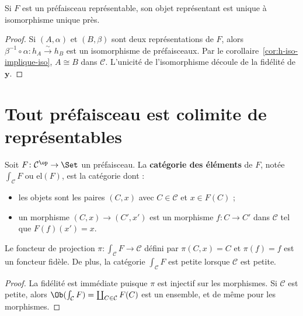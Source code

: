 \begin{proposition}\label{prop:representant-unique}
Si $F$ est un préfaisceau représentable, son objet représentant
est unique à isomorphisme unique près.
\end{proposition}

\begin{proof}
Si $(A, \alpha)$ et $(B, \beta)$ sont deux représentations de $F$,
alors $\beta^{-1} \circ \alpha \colon h_A \xrightarrow{\sim} h_B$
est un isomorphisme de préfaisceaux. Par le
corollaire~\ref{cor:h-iso-implique-iso}, $A \cong B$ dans $\mathcal{C}$.
L'unicité de l'isomorphisme découle de la fidélité de $\mathbf{y}$.
\end{proof}


\section{Tout préfaisceau est colimite de représentables}%
\label{sec:prefaisceau-colimite}

\begin{definition}\label{def:categorie-elements}
Soit $F \colon \mathcal{C}^{\op} \to \Set$ un préfaisceau.
La \textbf{catégorie des éléments} de $F$, notée
$\int_{\mathcal{C}} F$ ou $\mathrm{el}(F)$, est la catégorie dont :
\begin{itemize}
    \item les objets sont les paires $(C, x)$ avec $C \in \mathcal{C}$
    et $x \in F(C)$ ;
    \item un morphisme $(C, x) \to (C', x')$ est un morphisme
    $f \colon C \to C'$ dans $\mathcal{C}$ tel que $F(f)(x') = x$.
\end{itemize}
\end{definition}

\begin{proposition}\label{prop:el-projection}
Le foncteur de projection $\pi \colon \int_{\mathcal{C}} F \to \mathcal{C}$
défini par $\pi(C, x) = C$ et $\pi(f) = f$ est un foncteur fidèle.
De plus, la catégorie $\int_{\mathcal{C}} F$ est petite lorsque
$\mathcal{C}$ est petite.
\end{proposition}

\begin{proof}
La fidélité est immédiate puisque $\pi$ est injectif sur les morphismes.
Si $\mathcal{C}$ est petite, alors $\Ob(\int_{\mathcal{C}} F)
= \coprod_{C \in \mathcal{C}} F(C)$ est un ensemble, et de même pour
les morphismes.
\end{proof}

